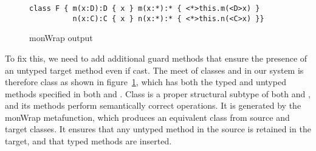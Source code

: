 \documentclass[sigconf]{acmart}
\begin{document}
\begin{figure}[h]
\begin{lstlisting}
class F { m(x:D):D { x } m(x:*):* { <*>this.m(<D>x) }
          n(x:C):C { x } n(x:*):* { <*>this.n(<C>x) }}
\end{lstlisting}
\caption{monWrap output}
\label{fig:monwrap}
\end{figure}


To fix this, we need to add additional guard methods that ensure the presence
of an untyped target method even if cast. The meet of classes \C and \D in our
system is therefore class  as shown in figure~\ref{fig:monwrap}, which
has both the typed and untyped methods specified in both \C and \D. Class
 is a proper structural subtype of both \C and \D, and its methods
perform semantically correct operations. It is generated by the monWrap
metafunction, which produces an equivalent class from source and target
classes. It ensures that any untyped method in the source is retained in
the target, and that typed methods are inserted. 
\end{document}
